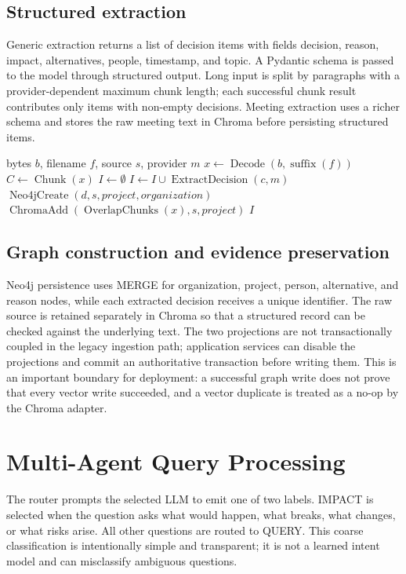 \documentclass[conference]{IEEEtran}
\begin{document}
\subsection{Structured extraction}
Generic extraction returns a list of decision items with fields decision, reason, impact, alternatives, people, timestamp, and topic. A Pydantic schema is passed to the model through structured output. Long input is split by paragraphs with a provider-dependent maximum chunk length; each successful chunk result contributes only items with non-empty decisions. Meeting extraction uses a richer schema and stores the raw meeting text in Chroma before persisting structured items.

\begin{algorithm}[t]
\caption{Document ingestion and graph projection}
\label{alg:ingest}
\begin{algorithmic}[1]
\Require bytes $b$, filename $f$, source $s$, provider $m$
\State $x\gets\operatorname{Decode}(b,\operatorname{suffix}(f))$
\State $C\gets\operatorname{Chunk}(x)$
\State $I\gets\emptyset$
  \State $I\gets I\cup\operatorname{ExtractDecision}(c,m)$
\EndFor
{}
  \State $\operatorname{Neo4jCreate}(d,s,project,organization)$
\EndFor
\State $\operatorname{ChromaAdd}(\operatorname{OverlapChunks}(x),s,project)$
\State \Return $I$
\end{algorithmic}
\end{algorithm}

\subsection{Graph construction and evidence preservation}
Neo4j persistence uses MERGE for organization, project, person, alternative, and reason nodes, while each extracted decision receives a unique identifier. The raw source is retained separately in Chroma so that a structured record can be checked against the underlying text. The two projections are not transactionally coupled in the legacy ingestion path; application services can disable the projections and commit an authoritative transaction before writing them. This is an important boundary for deployment: a successful graph write does not prove that every vector write succeeded, and a vector duplicate is treated as a no-op by the Chroma adapter.

\section{Multi-Agent Query Processing}
The router prompts the selected LLM to emit one of two labels. IMPACT is selected when the question asks what would happen, what breaks, what changes, or what risks arise. All other questions are routed to QUERY. This coarse classification is intentionally simple and transparent; it is not a learned intent model and can misclassify ambiguous questions.
\end{document}
